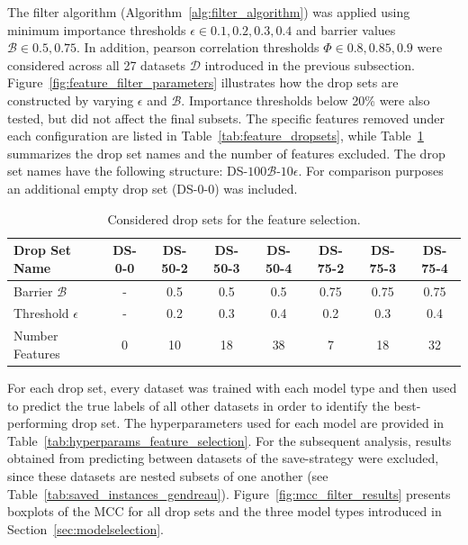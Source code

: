 The filter algorithm (Algorithm~\ref{alg:filter_algorithm}) was applied using minimum importance thresholds $\epsilon \in {0.1, 0.2, 0.3, 0.4}$
and barrier values $\mathcal{B} \in {0.5, 0.75}$. In addition, pearson correlation thresholds $\Phi \in {0.8, 0.85, 0.9}$ were considered
across all 27 datasets $\mathcal{D}$ introduced in the previous subsection. Figure~\ref{fig:feature_filter_parameters}
illustrates how the drop sets are constructed by varying $\epsilon$ and $\mathcal{B}$. Importance thresholds below 20\% were also tested, but
did not affect the final subsets. The specific features removed under each configuration are listed in Table~\ref{tab:feature_dropsets},
while Table~\ref{tab:drop_set_presentation_shortened} summarizes the drop set names and the number of features excluded. The drop set
names have the following structure: DS-$100\mathcal{B}$-$10\epsilon$. For comparison purposes an additional empty drop set (DS-0-0) was included.

\begin{table}[ht]
	\centering
	\small
	\begin{tabular}{l c c c c c c c}
		\toprule
		Drop Set Name         & DS-0-0 & DS-50-2 & DS-50-3 & DS-50-4 & DS-75-2 & DS-75-3 & DS-75-4 \\
		\midrule
		Barrier $\mathcal{B}$ & -      & 0.5     & 0.5     & 0.5     & 0.75    & 0.75    & 0.75    \\
		Threshold $\epsilon$  & -      & 0.2     & 0.3     & 0.4     & 0.2     & 0.3     & 0.4     \\
		Number Features       & 0      & 10      & 18      & 38      & 7       & 18      & 32      \\
		\bottomrule
	\end{tabular}
	\caption{Considered drop sets for the feature selection.}
	\label{tab:drop_set_presentation_shortened}
\end{table}
For each drop set, every dataset was trained with each model type and then used to predict the
true labels of all other datasets in order to identify the best-performing drop set. The hyperparameters used for
each model are provided in Table~\ref{tab:hyperparams_feature_selection}. For the subsequent analysis,
results obtained from predicting between datasets of the save-strategy were excluded, since these datasets are nested
subsets of one another (see Table~\ref{tab:saved_instances_gendreau}). Figure~\ref{fig:mcc_filter_results} presents boxplots of
the \gls{MCC} for all drop sets and the three model types introduced in Section~\ref{sec:modelselection}.

